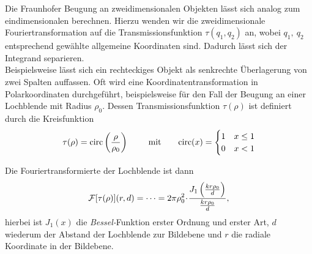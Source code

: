 Die Fraunhofer Beugung an zweidimensionalen Objekten lässt sich analog zum eindimensionalen berechnen. Hierzu wenden wir die zweidimensionale Fouriertransformation auf die Transmissionsfunktion $\tau(q_1,q_2)$ an, wobei $q_1,~q_2$ entsprechend gewählte allgemeine Koordinaten sind. Dadurch lässt sich der Integrand separieren.\\
Beispielsweise lässt sich ein rechteckiges Objekt als senkrechte Überlagerung von zwei Spalten auffassen. Oft wird eine Koordinatentransformation in Polarkoordinaten durchgeführt, beispielsweise für den Fall der Beugung an einer Lochblende mit Radius $\rho_0$. Dessen Transmissionsfunktion $\tau(\rho)$ ist definiert durch die Kreisfunktion
\begin{equation}
\tau(\rho) = \mathrm{circ}\left(\frac{\rho}{\rho_0}\right)
\with \mathrm{circ}(x) =
\begin{cases}
	1 & x \le 1\\
	0  & x < 1
\end{cases}
\end{equation}

Die Fouriertransformierte der Lochblende ist dann
\begin{align}
\mathcal{F}[\tau(\rho)](r,d)=\dots =2\pi\rho_0^2\!\cdot\!\frac{J_1\left(\frac{kr\rho_0}{d}\right)}{\frac{kr\rho_0}{d}},
\end{align}
hierbei ist $J_1(x)$ die \emph{Bessel-}Funktion erster Ordnung und erster Art, $d$ wiederum der Abstand der Lochblende zur Bildebene und $r$ die radiale Koordinate in der Bildebene.


